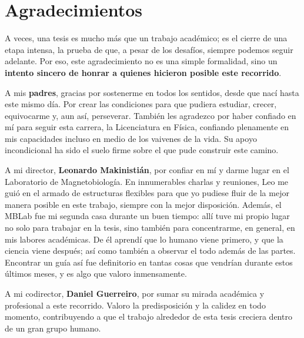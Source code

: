 \chapter*{Agradecimientos}



\vspace{1.2em}

A veces, una tesis es mucho más que un trabajo académico; es el cierre de una etapa intensa, la prueba de que, a pesar de los desafíos, siempre podemos seguir adelante. Por eso, este agradecimiento no es una simple formalidad, sino un \textbf{intento sincero de honrar a quienes hicieron posible este recorrido}.

\bigskip

A mis \textbf{padres}, gracias por sostenerme en todos los sentidos, desde que nací hasta este mismo día. Por crear las condiciones para que pudiera estudiar, crecer, equivocarme y, aun así, perseverar. También les agradezco por haber confiado en mí para seguir esta carrera, la Licenciatura en Física, confiando plenamente en mis capacidades incluso en medio de los vaivenes de la vida. Su apoyo incondicional ha sido el suelo firme sobre el que pude construir este camino.


\bigskip

A mi director, \textbf{Leonardo Makinistián}, por confiar en mí y darme lugar en el Laboratorio de Magnetobiología. En innumerables charlas y reuniones, Leo me guió en el armado de estructuras flexibles para que yo pudiese fluir de la mejor manera posible en este trabajo, siempre con la mejor disposición. Además, el MBLab fue mi segunda casa durante un buen tiempo: allí tuve mi propio lugar no solo para trabajar en la tesis, sino también para concentrarme, en general, en mis labores académicas. De él aprendí que lo humano viene primero, y que la ciencia viene después; así como también a observar el todo además de las partes. Encontrar un guía así fue definitorio en tantas cosas que vendrían durante estos últimos meses, y es algo que valoro inmensamente.

\bigskip

A mi codirector, \textbf{Daniel Guerreiro}, por sumar su mirada académica y profesional a este recorrido. Valoro la predisposición y la calidez en todo momento, contribuyendo a que el trabajo alrededor de esta tesis creciera dentro de un gran grupo humano.

\bigskip

